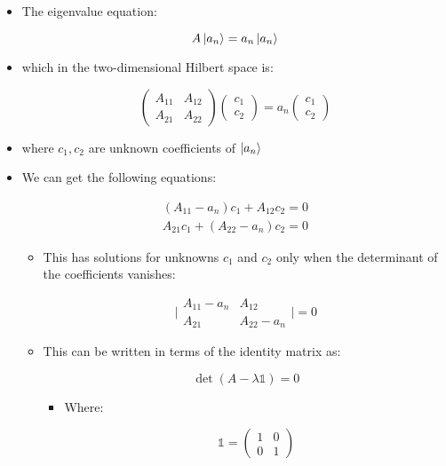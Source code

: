 \begin{itemize}
\begin{itemize}
      \item The eigenvalue equation:

        $$A\ket{a_n}=a_n\ket{a_n}$$

      \item which in the two-dimensional Hilbert space is:

        $$\left( \begin{matrix} A_{11} & A_{12}\\A_{21} & A_{22}\end{matrix} \right)\left( \begin{matrix} c_1\\c_2\end{matrix} \right)=a_n\left( \begin{matrix} c_1\\c_2\end{matrix} \right)$$

      \item where $c_1,c_2$ are unknown coefficients of $\ket{a_n}$

      \item We can get the following equations:

        $$\begin{matrix} (A_{11}-a_n)c_1+A_{12}c_2=0\\ A_{21}c_1+(A_{22}-a_n)c_2=0\end{matrix}$$

        \begin{itemize}

          \item This has solutions for unknowns $c_1$ and $c_2$ only when the determinant of the coefficients vanishes:

            $$\Big|\begin{matrix} A_{11}-a_n & A_{12}\\ A_{21} & A_{22}-a_n\end{matrix}\Big|=0$$

          \item This can be written in terms of the identity matrix as:

            $$\det(A-\lambda\mathbb{1})=0$$

            \begin{itemize}

              \item Where:

                $$\mathbb{1}=\left( \begin{matrix} 1 & 0\\ 0 & 1\end{matrix} \right)$$


\end{itemize}
\end{itemize}
\end{itemize}
\end{itemize}
